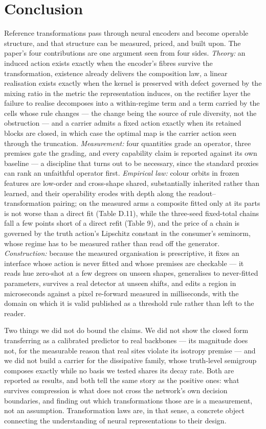 \section{Conclusion}

Reference transformations pass through neural encoders and become operable structure, and that structure can be measured, priced, and built upon. The paper's four contributions are one argument seen from four sides. \textit{Theory:} an induced action exists exactly when the encoder's fibres survive the transformation, existence already delivers the composition law, a linear realisation exists exactly when the kernel is preserved with defect governed by the mixing ratio in the metric the representation induces, on the rectifier layer the failure to realise decomposes into a within-regime term and a term carried by the cells whose rule changes --- the change being the source of rule diversity, not the obstruction --- and a carrier admits a fixed action exactly when its retained blocks are closed, in which case the optimal map is the carrier action seen through the truncation. \textit{Measurement:} four quantities grade an operator, three premises gate the grading, and every capability claim is reported against its own baseline --- a discipline that turns out to be necessary, since the standard proxies can rank an unfaithful operator first. \textit{Empirical law:} colour orbits in frozen features are low-order and cross-shape shared, substantially inherited rather than learned, and their operability erodes with depth along the readout--transformation pairing; on the measured arms a composite fitted only at its parts is not worse than a direct fit (Table D.11), while the three-seed fixed-total chains fall a few points short of a direct refit (Table 9), and the price of a chain is governed by the truth action's Lipschitz constant in the consumer's seminorm, whose regime has to be measured rather than read off the generator. \textit{Construction:} because the measured organisation is prescriptive, it fixes an interface whose action is never fitted and whose premises are checkable --- it reads hue zero-shot at a few degrees on unseen shapes, generalises to never-fitted parameters, survives a real detector at unseen shifts, and edits a region in microseconds against a pixel re-forward measured in milliseconds, with the domain on which it is valid published as a threshold rule rather than left to the reader.

Two things we did not do bound the claims. We did not show the closed form transferring as a calibrated predictor to real backbones --- its magnitude does not, for the measurable reason that real sites violate its isotropy premise --- and we did not build a carrier for the dissipative family, whose truth-level semigroup composes exactly while no basis we tested shares its decay rate. Both are reported as results, and both tell the same story as the positive ones: what survives compression is what does not cross the network's own decision boundaries, and finding out which transformations those are is a measurement, not an assumption. Transformation laws are, in that sense, a concrete object connecting the understanding of neural representations to their design.

